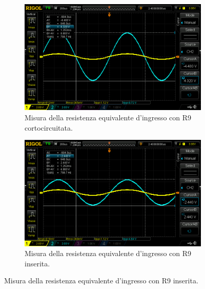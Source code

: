 \documentclass[a4paper]{article}
\begin{document}
				\begin{figure}[h!]
					\centering
					\begin{subfigure}{0.4\textwidth}
						\centering
						\includegraphics[scale=0.2]{misuraDellaResistenzaEquivalenteInIngressoAmplificatoreNonInvertenteR9InCorto}
						\caption{Misura della resistenza equivalente d'ingresso con R9 cortocircuitata.}
					\end{subfigure}
					\begin{subfigure}{0.4\textwidth}
						\centering
						\includegraphics[scale=0.2]{misuraDellaResistenzaEquivalenteInIngressoAmplificatoreNonInvertenteR9Inserita}
						\caption{Misura della resistenza equivalente d'ingresso con R9 inserita.}
					\end{subfigure}
					\label{fig:misuraDellaResistenzaEquivalenteInIngressoAmplificatoreNonInvertente}
				\end{figure}
\end{document}
